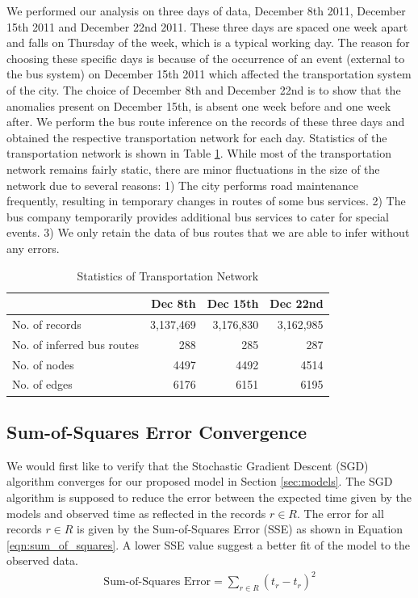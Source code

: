 \documentclass[draft]{sig-alternate}
\begin{document}
We performed our analysis on three days of data, December 8th 2011, December 15th 2011 and December 22nd 2011. These three days are spaced one week apart and falls on Thursday of the week, which is a typical working day. The reason for choosing these specific days is because of the occurrence of an event (external to the bus system) on December 15th 2011 which affected the transportation system of the city. The choice of December 8th and December 22nd is to show that the anomalies present on December 15th, is absent one week before and one week after. We perform the bus route inference on the records of these three days and obtained the respective transportation network for each day. Statistics of the transportation network is shown in Table \ref{tbl:statistics}. While most of the transportation network remains fairly static, there are minor fluctuations in the size of the network due to several reasons: 1) The city performs road maintenance frequently, resulting in temporary changes in routes of some bus services. 2) The bus company temporarily provides additional bus services to cater for special events. 3) We only retain the data of bus routes that we are able to infer without any errors.
\begin{table}[htb]
	\centering
	\caption{Statistics of Transportation Network}
	\label{tbl:statistics}
	\begin{tabular}{|p{2.1cm}|r|r|r|}
		\hline
			& Dec 8th & Dec 15th & Dec 22nd \\
		\hline
		No. of records & 3,137,469 & 3,176,830 & 3,162,985 \\
		\hline
		No. of inferred bus routes & 288 & 285 & 287 \\
		\hline
		No. of nodes & 4497 & 4492 & 4514 \\
		\hline
		No. of edges & 6176 & 6151 & 6195 \\
		\hline
	\end{tabular}
\end{table}

\subsection{Sum-of-Squares Error Convergence}

We would first like to verify that the Stochastic Gradient Descent (SGD) algorithm converges for our proposed model in Section \ref{sec:models}. The SGD algorithm is supposed to reduce the error between the expected time given by the models and observed time as reflected in the records $r \in R$. The error for all records $r \in R$ is given by the Sum-of-Squares Error (SSE) as shown in Equation \ref{eqn:sum_of_squares}. A lower SSE value suggest a better fit of the model to the observed data.
\begin{align}
	\label{eqn:sum_of_squares}
	\text{Sum-of-Squares Error} = \sum_{r \in R} (t_r - \hat{t}_r)^2 
\end{align}
\end{document}
